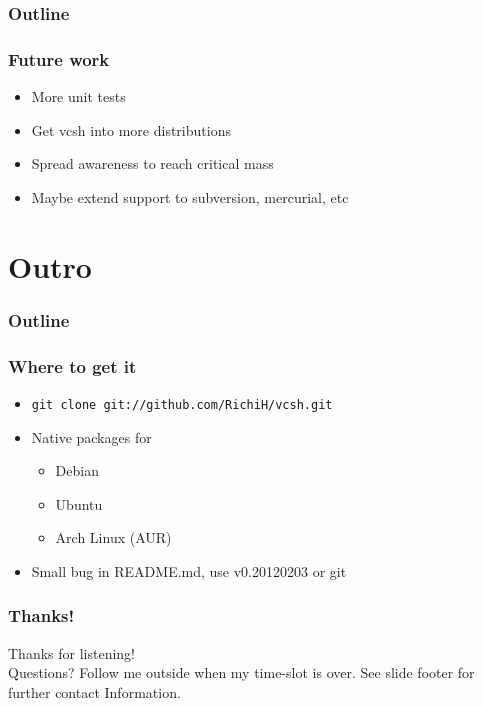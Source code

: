 \documentclass[t]{beamer}
\begin{document}
\begin{frame}
	\frametitle{Outline}
	\tableofcontents[currentsection]
\end{frame}

\begin{frame}
	\frametitle{Future work}
	\begin{itemize}
		\item More unit tests
		\item Get vcsh into more distributions
		\item Spread awareness to reach critical mass
		\item Maybe extend support to subversion, mercurial, etc
	\end{itemize}
\end{frame}

\section{Outro}

\begin{frame}
	\frametitle{Outline}
	\tableofcontents[currentsection]
\end{frame}

\begin{frame}
	\frametitle{Where to get it}
	\begin{itemize}
		\item \texttt{git clone git://github.com/RichiH/vcsh.git}
		\item Native packages for
		\begin{itemize}
			\item Debian
			\item Ubuntu
			\item Arch Linux (AUR)
		\end{itemize}
		\item Small bug in README.md, use v0.20120203 or git
	\end{itemize}
\end{frame}

\begin{frame}
	\frametitle{Thanks!}
		\begin{center}
			\vfill
			Thanks for listening!\\
			\vfill
			Questions? Follow me outside when my time-slot is over.
			\vfill
			See slide footer for further contact Information.
			\vfill
		\end{center}
\end{frame}
\end{document}
